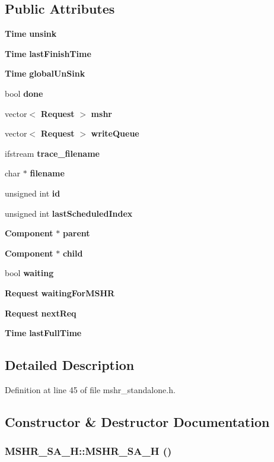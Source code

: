 \subsection*{Public Attributes}
\begin{CompactItemize}
\item 
{\bf Time} {\bf unsink}
\item 
{\bf Time} {\bf lastFinishTime}
\item 
{\bf Time} {\bf globalUnSink}
\item 
bool {\bf done}
\item 
vector$<$ {\bf Request} $>$ {\bf mshr}
\item 
vector$<$ {\bf Request} $>$ {\bf writeQueue}
\item 
ifstream {\bf trace\_\-filename}
\item 
char $\ast$ {\bf filename}
\item 
unsigned int {\bf id}
\item 
unsigned int {\bf lastScheduledIndex}
\item 
{\bf Component} $\ast$ {\bf parent}
\item 
{\bf Component} $\ast$ {\bf child}
\item 
bool {\bf waiting}
\item 
{\bf Request} {\bf waitingForMSHR}
\item 
{\bf Request} {\bf nextReq}
\item 
{\bf Time} {\bf lastFullTime}
\end{CompactItemize}


\subsection{Detailed Description}


Definition at line 45 of file mshr\_\-standalone.h.

\subsection{Constructor \& Destructor Documentation}
\subsubsection[{MSHR\_\-SA\_\-H}]{\setlength{\rightskip}{0pt plus 5cm}MSHR\_\-SA\_\-H::MSHR\_\-SA\_\-H ()}\label{classMSHR__SA__H_0d022c40990c1c0cefd958abb45699e7}




